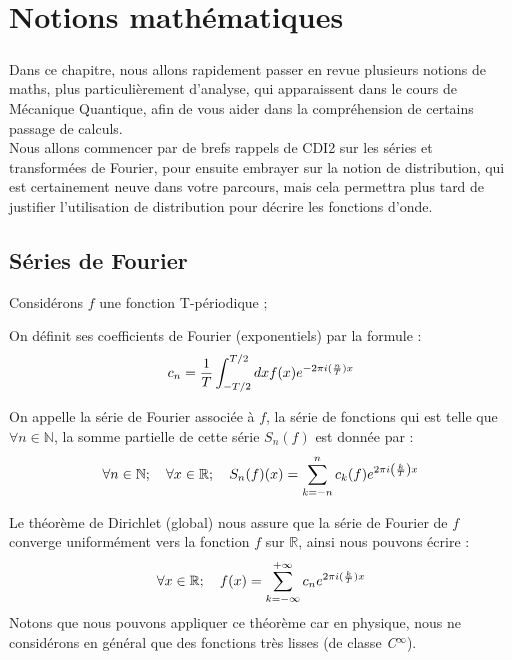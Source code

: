 \documentclass[../notesdecours.tex]{subfiles}
\begin{document}
    
\chapter{Notions mathématiques}

\paragraph{} Dans ce chapitre, nous allons rapidement passer en revue plusieurs notions de maths, 
plus particulièrement d'analyse, qui apparaissent dans le cours de Mécanique Quantique, 
afin de vous aider dans la compréhension de certains passage de calculs. \\
Nous allons commencer par de brefs rappels de CDI2 sur les séries et transformées de Fourier, 
pour ensuite embrayer sur la notion de distribution, qui est certainement neuve dans votre parcours,
mais cela permettra plus tard de justifier l'utilisation de distribution pour décrire les fonctions d'onde. \\

\section{Séries de Fourier}
Considérons $f$ une fonction T-périodique ; \\

\begin{definition}
    On définit ses coefficients de Fourier (exponentiels) par la formule : 
\begin{equation}
c_n = \frac{1}{T} \int^{T/2}_{-T/2} dx f(x)e^{-2\pi i(\frac{n}{T})x} \\
\end{equation}
\end{definition}

\begin{definition}
    On appelle la série de Fourier associée à $f$, la série de fonctions qui est telle que 
$\forall n \in \mathbb{N}$, la somme partielle de cette série $S_n(f)$ est donnée par :
\begin{equation}
    \forall n\in \mathbb{N} ; \quad \forall x \in \mathbb{R} ;  \quad S_n(f)(x) = \sum_{k=-n}^{n} c_k(f) e^{2\pi i \left( \frac{k}{T} \right) x} \\
\end{equation}
\end{definition}

\begin{theorem}
    Le théorème de Dirichlet (global) nous assure que la série de Fourier de $f$ converge uniformément 
vers la fonction $f$ sur $\mathbb{R}$, ainsi nous pouvons écrire :  
\begin{equation}
    \forall x \in \mathbb{R} ; \quad f(x) = \sum_{k = -\infty}^{+\infty}c_ne^{2\pi i (\frac{k}{T})x} \\
\end{equation}
Notons que nous pouvons appliquer ce théorème car en physique, nous ne considérons en général que des fonctions très lisses (de classe \textit{C}$^{\infty}$).
\end{theorem}
\end{document}
